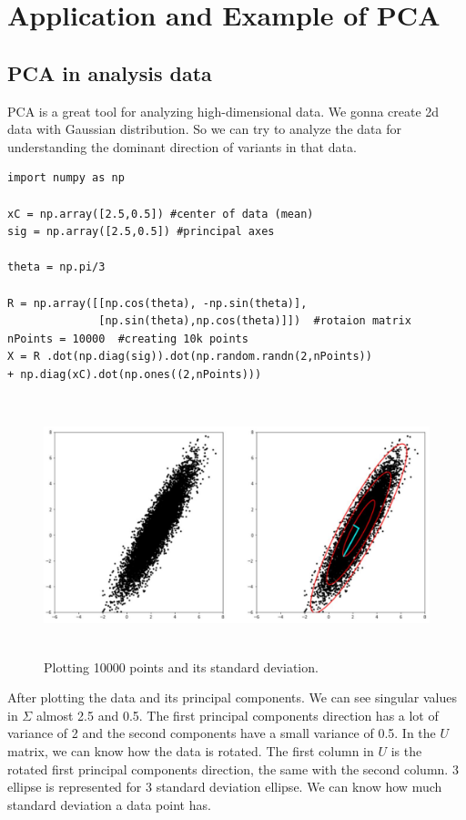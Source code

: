 \documentclass[a4paper, 12pt]{report}
\begin{document}
\section{Application and Example of PCA} 
\subsection{PCA in analysis data}

\indent \par PCA is a great tool for analyzing high-dimensional data. We gonna create 2d data with Gaussian distribution. So we can try to analyze the data for understanding the dominant direction of variants in that data.
\begin{verbatim}
import numpy as np

xC = np.array([2.5,0.5]) #center of data (mean)
sig = np.array([2.5,0.5]) #principal axes

theta = np.pi/3

R = np.array([[np.cos(theta), -np.sin(theta)], 
              [np.sin(theta),np.cos(theta)]])  #rotaion matrix
nPoints = 10000  #creating 10k points
X = R .dot(np.diag(sig)).dot(np.random.randn(2,nPoints))
+ np.diag(xC).dot(np.ones((2,nPoints)))
\end{verbatim}
\begin{figure}[H]
    \center
    \includegraphics[width=15cm,height=7.5cm]{pca1.jpg}
    \caption{Plotting 10000 points and its standard deviation.}
\end{figure}
\indent \par After plotting the data and its principal components. We can see singular values in $\Sigma$ almost 2.5 and 0.5. The first principal components direction has a lot of variance of 2 and the second components have a small variance of 0.5. In the $U$ matrix, we can know how the data is rotated. The first column in $U$ is the rotated first principal components direction, the same with the second column.
3 ellipse is represented for 3 standard deviation ellipse. We can know how much standard deviation a data point has.
\end{document}
